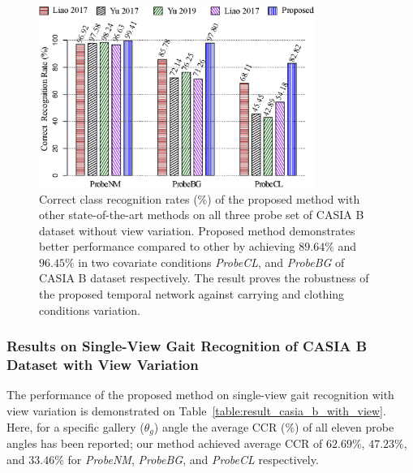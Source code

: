 \begin{figure}
	\centering
	\includegraphics[width = 0.8\textwidth]{figures/comp_casia_b_without_view.eps}
	\caption [Correct class recognition rates (\%) of the proposed method with other state-of-the-art methods on all three probe set of CASIA B dataset without view variation] 
	{Correct class recognition rates (\%) of the proposed method with other state-of-the-art methods on all three probe set of CASIA B dataset without view variation. Proposed method demonstrates better performance compared to other by achieving $89.64\%$ and $96.45\%$ in two covariate conditions \textit{ProbeCL}, and \textit{ProbeBG} of CASIA B dataset respectively. The result proves the robustness of the proposed temporal network against carrying and clothing conditions variation.  \label{fig:comp_casia_b_without_view}
	}
\end{figure}


\subsubsection{Results on Single-View Gait Recognition of CASIA B Dataset with View Variation}
The performance of the proposed method on single-view gait recognition with view variation is demonstrated on Table~\ref{table:result_casia_b_with_view}. Here, for a specific gallery ($ \theta_g $) angle the average CCR (\%) of all eleven probe angles has been reported; our method achieved average CCR of $62.69\%$, $47.23\%$, and $33.46\%$ for \textit{ProbeNM}, \textit{ProbeBG}, and \textit{ProbeCL} respectively.


